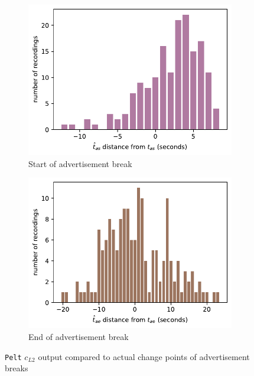 \begin{figure}[H]
    \begin{subfigure}[t]{.49\textwidth}
      \centering
      \includegraphics[width=\linewidth]{../plots/distances/pelt_l2_dist_ads_first.pdf}
      \caption{Start of advertisement break}
      \label{fig:t_diff_ads_start}
    \end{subfigure}
    \hfill
    \begin{subfigure}[t]{.49\textwidth}
      \centering
      \includegraphics[width=\linewidth]{../plots/distances/pelt_l2_dist_ads_last.pdf}
      \caption{End of advertisement break}
      \label{fig:t_diff_ads_end}
    \end{subfigure}
    \caption{\texttt{Pelt} $c_{L2}$ output compared to actual change points of advertisement breaks}
    \label{fig:t_diff_ads}
\end{figure}

